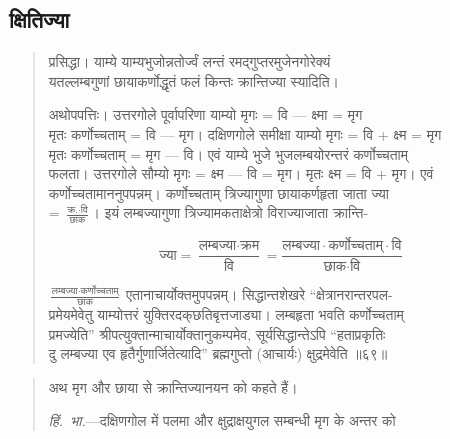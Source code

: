 \documentclass[11pt,a4paper]{article}
\newcommand{\dev}[1]{{\devanagarifont #1}}
\newenvironment{shloka}{%
  \begin{quote}
  \small
  \setlength{\leftmargin}{2em}
  \devanagarifont
}{\end{quote}}
\newenvironment{vyakhya}{%
  \begin{quote}
  \small
  \setlength{\leftmargin}{1em}
  \devanagarifont
}{\end{quote}}
\newcommand{\skt}[1]{{\devanagarifont #1}}
\begin{document}
\subsection{\dev{क्षितिज्या}}

\begin{shloka}
\skt{प्रसिद्धा। याम्ये याम्यभुजोन्नतोर्ज्वं लन्तं रमद्‌गुप्तरमुजेनगोरेक्यं}\\
\skt{यतल्लम्बगुणां छायाकर्णोद्धृतं फलं किन्तः क्रान्तिज्या स्यादिति।}

\skt{अथोपपत्तिः। उत्तरगोले पूर्वापरिणा याम्यो मृगः = वि — क्ष्मा = मृग}\\
\skt{मृतः कर्णोच्चताम् = वि — मृग। दक्षिणगोले समीक्षा याम्यो मृगः = वि + क्ष्म = मृग}\\
\skt{मृतः कर्णोच्चताम् = मृग — वि। एवं याम्ये भुजे भुजलम्बयोरन्तरं कर्णोच्चताम्}\\
\skt{फलता। उत्तरगोले सौम्यो मृगः = क्ष्म — वि = मृग। मृतः क्ष्म = वि + मृग। एवं}\\
\skt{कर्णोच्चतामाननुपपन्नम्। कर्णोच्चताम् त्रिज्यागुणा छायाकर्णहृता जाता ज्या}\\
\skt{= $\frac{\text{क्र.} \cdot \text{वि}}{\text{छाक}}$। इयं लम्बज्यागुणा त्रिज्यामकताक्षेत्रो विराज्याजाता क्रान्ति-}

\begin{equation*}
\text{ज्या} = \frac{\text{लम्बज्या} \cdot \text{क्रम}}{\text{वि}} = \frac{\text{लम्बज्या} \cdot \text{कर्णोच्चताम्} \cdot \text{वि}}{\text{छाक} \cdot \text{वि}}
\end{equation*}

\skt{$\frac{\text{लम्बज्या} \cdot \text{कर्णोच्चताम्}}{\text{छाक}}$ एतानाचार्योक्तमुपपन्नम्। सिद्धान्तशेखरे ``क्षेत्रानरान्तरपल-}\\
\skt{प्रमेयमेवेतु याम्योत्तरं युक्तिरदक्‌छतिबृत्तजाड्या। लम्बहृता भवति कर्णोच्चताम्}\\
\skt{प्रमज्येति'' श्रीपत्युक्तान्माचार्योक्तानुकम्पमेव, सूर्यसिद्धान्तेऽपि ``हताप्रकृतिः}\\
\skt{दु लम्बज्या एव हृतैर्गुणार्जितेत्यादि'' ब्रह्मगुप्तो (आचार्यः) क्षुद्रमेवेति ॥६९॥}
\end{shloka}

\begin{vyakhya}
\skt{अथ मृग और छाया से क्रान्तिज्यानयन को कहते हैं।}

\textit{हिं.\ भा.}—\skt{दक्षिणगोल में पलमा और क्षुद्राक्षयुगल सम्बन्धी मृग के अन्तर को}
\end{vyakhya}
\end{document}
